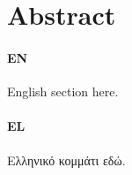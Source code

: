 \setlength{\parskip}{0pt}

\clearpage
\chapter*{Abstract}

\subsubsection{EN}
English section here.

\subsubsection{EL}
Ελληνικό κομμάτι εδώ.